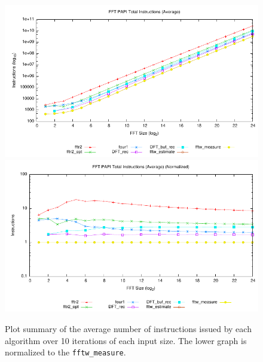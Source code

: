 \documentclass[11 pt]{article}
\begin{document}
\begin{figure}[htbp]
  \centering
	\includegraphics[width=\columnwidth]{../plots/tot_ins_ave}
	\includegraphics[width=\columnwidth]{../plots/tot_ins_ave_norm}
  \caption{Plot summary of the average number of instructions issued by
           each algorithm over 10 iterations of each input size.  The lower
           graph is normalized to the {\tt fftw\_measure}.}
  \label{fig:ins_ave}
\end{figure}
\end{document}
